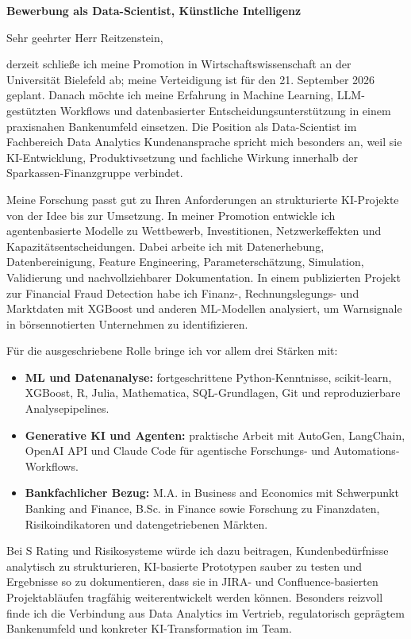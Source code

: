 \documentclass[11pt]{article}
\begin{document}
\vspace{0.05cm}

\noindent
\textbf{Bewerbung als Data-Scientist, K\"unstliche Intelligenz} 

\noindent Sehr geehrter Herr Reitzenstein,

derzeit schlie\ss{}e ich meine Promotion in Wirtschaftswissenschaft an der Universität Bielefeld ab; 
meine Verteidigung ist für den 21. September 2026 geplant. 
Danach möchte ich meine Erfahrung in Machine Learning, 
LLM-gestützten Workflows und datenbasierter Entscheidungsunterstützung 
in einem praxisnahen Bankenumfeld einsetzen. 
Die Position als Data-Scientist im Fachbereich Data Analytics Kundenansprache 
spricht mich besonders an, weil sie KI-Entwicklung, Produktivsetzung 
und fachliche Wirkung innerhalb der Sparkassen-Finanzgruppe verbindet.

Meine Forschung passt gut zu Ihren Anforderungen an strukturierte KI-Projekte von der Idee bis zur Umsetzung. 
In meiner Promotion entwickle ich agentenbasierte Modelle zu Wettbewerb, Investitionen, Netzwerkeffekten und Kapazitätsentscheidungen. 
Dabei arbeite ich mit Datenerhebung, Datenbereinigung, Feature Engineering, Parameterschätzung, Simulation, Validierung und nachvollziehbarer Dokumentation. 
In einem publizierten Projekt zur Financial Fraud Detection habe ich Finanz-, Rechnungslegungs- und Marktdaten mit XGBoost und anderen ML-Modellen analysiert, 
um Warnsignale in börsennotierten Unternehmen zu identifizieren.

Für die ausgeschriebene Rolle bringe ich vor allem drei Stärken mit:

\begin{itemize}
    \item \textbf{ML und Datenanalyse:} fortgeschrittene Python-Kenntnisse, scikit-learn, XGBoost, R, Julia, Mathematica, SQL-Grundlagen, Git und reproduzierbare Analysepipelines.
    \item \textbf{Generative KI und Agenten:} praktische Arbeit mit AutoGen, LangChain, OpenAI API und Claude Code für agentische Forschungs- und Automations-Workflows.
    \item \textbf{Bankfachlicher Bezug:} M.A. in Business and Economics mit Schwerpunkt Banking and Finance, B.Sc. in Finance sowie Forschung zu Finanzdaten, Risikoindikatoren und datengetriebenen Märkten.
\end{itemize}

Bei S Rating und Risikosysteme würde ich dazu beitragen, Kundenbedürfnisse analytisch zu strukturieren, KI-basierte Prototypen sauber zu testen und Ergebnisse so zu dokumentieren, dass sie in JIRA- und Confluence-basierten Projektabläufen tragfähig weiterentwickelt werden können. Besonders reizvoll finde ich die Verbindung aus Data Analytics im Vertrieb, regulatorisch geprägtem Bankenumfeld und konkreter KI-Transformation im Team.
\end{document}
